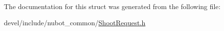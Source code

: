 The documentation for this struct was generated from the following file\-:\begin{DoxyCompactItemize}
\item 
devel/include/nubot\-\_\-common/\hyperlink{ShootRequest_8h}{Shoot\-Request.\-h}\end{DoxyCompactItemize}
